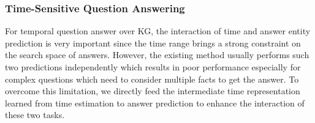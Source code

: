 \documentclass[11pt]{article}
\begin{document}
\begin{comment}

The CronKGQA \cite{saxena2021question} approach works by learning low-dimensional vector embeddings of entities and timestamps in KG and searching the answers from all of them. Inspired by information retrieval systems methods, we retrieve a broad set of candidate answers by extracting the neighbor graph  using the entities of questions. Hence we get fine-grained candidates from the neighbor graph to identify the exact answer. The facts in the neighbor graph provide us with an answer space that includes the entity candidates and timestamp candidates. The neighbor graph  is extracted directly using the n-hop neighbors of entities in question. Let  and  be the set of entities and the set of timestamps in  respectively for question .

\subsubsection{Temporal Expression Encoder}
\label{sec3_3_2}

For each question, we decompose it into question entities and a temporal expression template (e.g. ``Who held the position of  before ?''). Here we added three special tokens ,  and  into the Bert-based model.  Using the temporal expression template instead of the whole question allows us to learn context-agnostic representations of temporal relations that generalize across questions that have different entities but the similar temporal expressions. 

A temporal expression encoder is utilized to encode each temporal expression template with a pretrained language model (use BERT in our experiments) to get the temporal relation embeddings. 
In details, we design to combine BERT with linear layers to get two temporal relation embeddings:  and .  The  will be used to do the time estimation and  will be used for the entity prediction.
\end{comment}

\subsubsection{Time-Sensitive Question Answering}
\label{tbreasoning}







For temporal question answer over KG, the interaction of time and answer entity prediction is very important since the time range brings a strong constraint on the search space of answers. However, the existing method \cite{saxena2021question} usually performs such two predictions independently which results in poor performance especially for complex questions which need to consider multiple facts to get the answer. To overcome this limitation, we directly feed the intermediate time representation  learned from time estimation to answer prediction to enhance the interaction of these two tasks.
\end{document}

